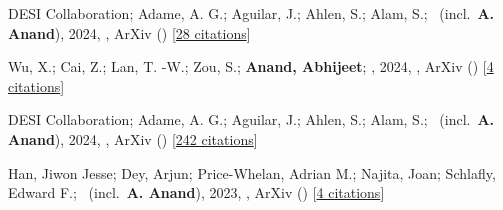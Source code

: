 \item[{\color{numcolor}\scriptsize4}] DESI Collaboration; Adame, A. G.; Aguilar, J.; Ahlen, S.; Alam, S.; \etal\ (incl.\ \textbf{A. Anand}), 2024, , ArXiv () [\href{https://ui.adsabs.harvard.edu/abs/2024arXiv241112020D}{28 citations}]

\item[{\color{numcolor}\scriptsize3}] Wu, X.; Cai, Z.; Lan, T. -W.; Zou, S.; \textbf{Anand, Abhijeet}; \etal, 2024, , ArXiv () [\href{https://ui.adsabs.harvard.edu/abs/2024arXiv240717809W}{4 citations}]

\item[{\color{numcolor}\scriptsize2}] DESI Collaboration; Adame, A. G.; Aguilar, J.; Ahlen, S.; Alam, S.; \etal\ (incl.\ \textbf{A. Anand}), 2024, , ArXiv () [\href{https://ui.adsabs.harvard.edu/abs/2024arXiv240403000D}{242 citations}]

\item[{\color{numcolor}\scriptsize1}] Han, Jiwon Jesse; Dey, Arjun; Price-Whelan, Adrian M.; Najita, Joan; Schlafly, Edward F.; \etal\ (incl.\ \textbf{A. Anand}), 2023, , ArXiv () [\href{https://ui.adsabs.harvard.edu/abs/2023arXiv230611784H}{4 citations}]